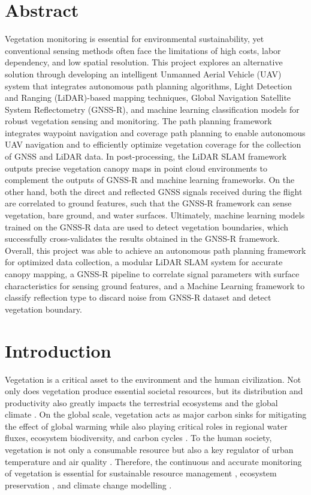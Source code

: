 \documentclass[12pt, a4paper]{article}
\begin{document}
\section{Abstract}
\begin{itshape}
Vegetation monitoring is essential for environmental sustainability, yet
conventional sensing methods often face the limitations of high costs, labor
dependency, and low spatial resolution. This project explores an alternative
solution through developing an intelligent Unmanned Aerial Vehicle (UAV) system
that integrates autonomous path planning algorithms, Light Detection and Ranging
(LiDAR)-based mapping techniques, Global Navigation Satellite System
Reflectometry (GNSS-R), and machine learning classification models for robust
vegetation sensing and monitoring. The path planning framework integrates
waypoint navigation and coverage path planning to enable autonomous UAV
navigation and to efficiently optimize vegetation coverage for the collection of
GNSS and LiDAR data. In post-processing, the LiDAR SLAM framework outputs
precise vegetation canopy maps in point cloud environments to complement the
outputs of GNSS-R and machine learning frameworks. On the other hand, both the
direct and reflected GNSS signals received during the flight are correlated to
ground features, such that the GNSS-R framework can sense vegetation, bare
ground, and water surfaces. Ultimately, machine learning models trained on the
GNSS-R data are used to detect vegetation boundaries, which successfully
cross-validates the results obtained in the GNSS-R framework. Overall, this
project was able to achieve an autonomous path planning framework for optimized
data collection, a modular LiDAR SLAM system for accurate canopy mapping, a
GNSS-R pipeline to correlate signal parameters with surface characteristics for
sensing ground features, and a Machine Learning framework to classify reflection
type to discard noise from GNSS-R dataset and detect vegetation boundary.

\end{itshape}

\newpage
\section{Introduction}
Vegetation is a critical asset to the environment and the human civilization.
Not only does vegetation produce essential societal resources, but its
distribution and productivity also greatly impacts the terrestrial ecosystems
and the global climate \cite{Richardson2013}. On the global scale, vegetation
acts as major carbon sinks for mitigating the effect of global warming while
also playing critical roles in regional water fluxes, ecosystem biodiversity,
and carbon cycles \cite{Richardson2013}. To the human society, vegetation is not
only a consumable resource but also a key regulator of urban temperature and air
quality \cite{OBrien2022}. Therefore, the continuous and accurate monitoring of
vegetation is essential for sustainable resource management \cite{Wallace2006},
ecosystem preservation \cite{Zeng2022}, and climate change modelling
\cite{Richardson2013}. 
\end{document}
